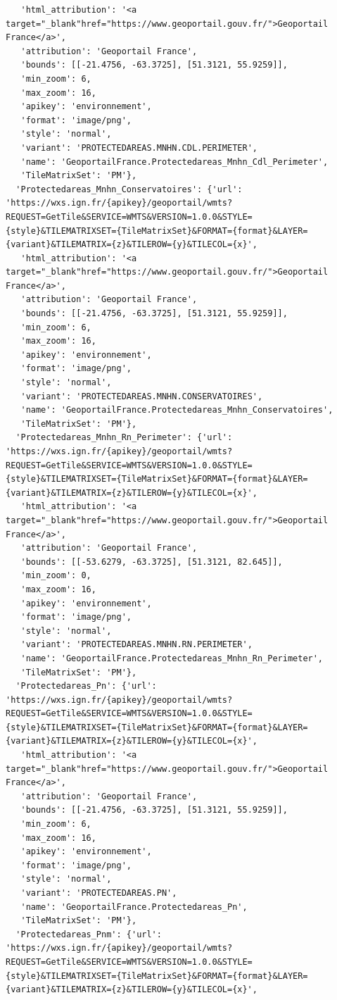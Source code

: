 \documentclass[
  letterpaper,
  DIV=11,
  numbers=noendperiod]{scrreprt}
\begin{document}
\begin{verbatim}
   'html_attribution': '<a target="_blank"href="https://www.geoportail.gouv.fr/">Geoportail France</a>',
   'attribution': 'Geoportail France',
   'bounds': [[-21.4756, -63.3725], [51.3121, 55.9259]],
   'min_zoom': 6,
   'max_zoom': 16,
   'apikey': 'environnement',
   'format': 'image/png',
   'style': 'normal',
   'variant': 'PROTECTEDAREAS.MNHN.CDL.PERIMETER',
   'name': 'GeoportailFrance.Protectedareas_Mnhn_Cdl_Perimeter',
   'TileMatrixSet': 'PM'},
  'Protectedareas_Mnhn_Conservatoires': {'url': 'https://wxs.ign.fr/{apikey}/geoportail/wmts?REQUEST=GetTile&SERVICE=WMTS&VERSION=1.0.0&STYLE={style}&TILEMATRIXSET={TileMatrixSet}&FORMAT={format}&LAYER={variant}&TILEMATRIX={z}&TILEROW={y}&TILECOL={x}',
   'html_attribution': '<a target="_blank"href="https://www.geoportail.gouv.fr/">Geoportail France</a>',
   'attribution': 'Geoportail France',
   'bounds': [[-21.4756, -63.3725], [51.3121, 55.9259]],
   'min_zoom': 6,
   'max_zoom': 16,
   'apikey': 'environnement',
   'format': 'image/png',
   'style': 'normal',
   'variant': 'PROTECTEDAREAS.MNHN.CONSERVATOIRES',
   'name': 'GeoportailFrance.Protectedareas_Mnhn_Conservatoires',
   'TileMatrixSet': 'PM'},
  'Protectedareas_Mnhn_Rn_Perimeter': {'url': 'https://wxs.ign.fr/{apikey}/geoportail/wmts?REQUEST=GetTile&SERVICE=WMTS&VERSION=1.0.0&STYLE={style}&TILEMATRIXSET={TileMatrixSet}&FORMAT={format}&LAYER={variant}&TILEMATRIX={z}&TILEROW={y}&TILECOL={x}',
   'html_attribution': '<a target="_blank"href="https://www.geoportail.gouv.fr/">Geoportail France</a>',
   'attribution': 'Geoportail France',
   'bounds': [[-53.6279, -63.3725], [51.3121, 82.645]],
   'min_zoom': 0,
   'max_zoom': 16,
   'apikey': 'environnement',
   'format': 'image/png',
   'style': 'normal',
   'variant': 'PROTECTEDAREAS.MNHN.RN.PERIMETER',
   'name': 'GeoportailFrance.Protectedareas_Mnhn_Rn_Perimeter',
   'TileMatrixSet': 'PM'},
  'Protectedareas_Pn': {'url': 'https://wxs.ign.fr/{apikey}/geoportail/wmts?REQUEST=GetTile&SERVICE=WMTS&VERSION=1.0.0&STYLE={style}&TILEMATRIXSET={TileMatrixSet}&FORMAT={format}&LAYER={variant}&TILEMATRIX={z}&TILEROW={y}&TILECOL={x}',
   'html_attribution': '<a target="_blank"href="https://www.geoportail.gouv.fr/">Geoportail France</a>',
   'attribution': 'Geoportail France',
   'bounds': [[-21.4756, -63.3725], [51.3121, 55.9259]],
   'min_zoom': 6,
   'max_zoom': 16,
   'apikey': 'environnement',
   'format': 'image/png',
   'style': 'normal',
   'variant': 'PROTECTEDAREAS.PN',
   'name': 'GeoportailFrance.Protectedareas_Pn',
   'TileMatrixSet': 'PM'},
  'Protectedareas_Pnm': {'url': 'https://wxs.ign.fr/{apikey}/geoportail/wmts?REQUEST=GetTile&SERVICE=WMTS&VERSION=1.0.0&STYLE={style}&TILEMATRIXSET={TileMatrixSet}&FORMAT={format}&LAYER={variant}&TILEMATRIX={z}&TILEROW={y}&TILECOL={x}',

\end{verbatim}
\end{document}
